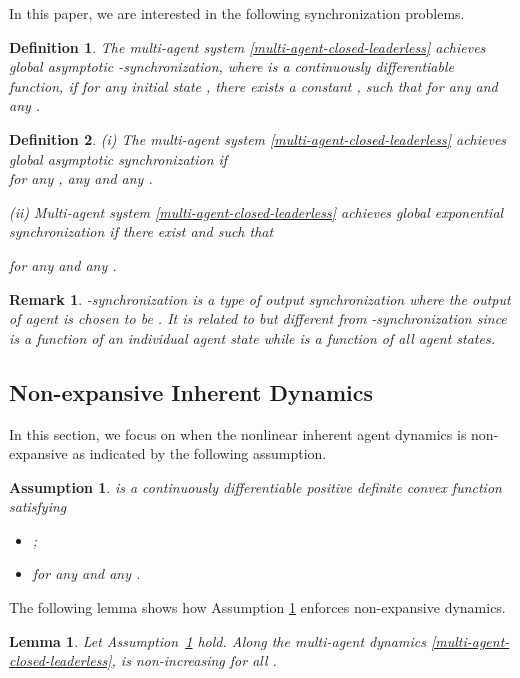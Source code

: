 \documentclass[a4paper, 11pt]{article}
\newtheorem{assumption}{Assumption}
\newtheorem{lemma}{Lemma}
\newtheorem{definition}{Definition}
\newtheorem{remark}{Remark}
\begin{document}
In this paper, we are interested in the following synchronization problems.

\begin{definition}\label{synch-def}
The multi-agent system \eqref{multi-agent-closed-leaderless} achieves global asymptotic -synchronization,
where  is a continuously differentiable function, if
for any initial state , there exists a constant , such that
 for any  and any .
\end{definition}


\begin{definition}\label{syn-asy}
(i) The multi-agent system \eqref{multi-agent-closed-leaderless} achieves global asymptotic synchronization if\\ 
 for any , any  and any .

(ii) Multi-agent system \eqref{multi-agent-closed-leaderless} achieves global exponential synchronization if there exist  and  such that

for any  and any .
\end{definition}


\begin{remark}
-synchronization is a type of output synchronization where the output of agent  is chosen to be . It is related to but different from -synchronization \cite{cortes-auto08,hong-JSSC2010} since
 is a function of an individual agent state while  is a function of all agent states.
\end{remark}


\subsection{Non-expansive Inherent Dynamics}\label{sec-ll}
In this section, we focus on when the nonlinear inherent agent dynamics is non-expansive as indicated by the following assumption.

\begin{assumption}\label{ass-lyap}
 is a continuously differentiable positive definite convex function
satisfying
\begin{itemize}
\item[(i).] ;
\item[(ii).]  for any  and any .
\end{itemize}
\end{assumption}

The following lemma shows how Assumption  \ref{ass-lyap} enforces non-expansive dynamics.
\begin{lemma}\label{lem-invariant-leaderless}
Let Assumption~\ref{ass-lyap} hold. Along the multi-agent dynamics \eqref{multi-agent-closed-leaderless},
 is non-increasing for all .
\end{lemma}
\end{document}
